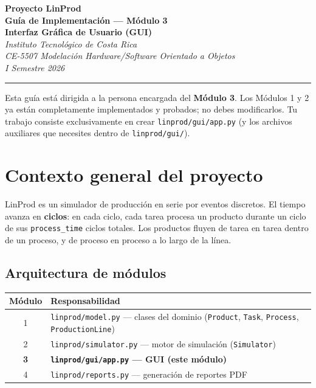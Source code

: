 \documentclass[12pt,letterpaper]{article}
\begin{document}
\begin{center}
    {\Large\bfseries Proyecto LinProd}\\[0.4em]
    {\LARGE\bfseries\color{tecred} Guía de Implementación — Módulo 3}\\[0.5em]
    {\large\bfseries Interfaz Gráfica de Usuario (GUI)}\\[1em]
    \textit{Instituto Tecnológico de Costa Rica}\\
    \textit{CE-5507 Modelación Hardware/Software Orientado a Objetos}\\
    \textit{I Semestre 2026}
\end{center}

\vspace{0.8em}
\hrule
\vspace{1em}

\begin{info}
Esta guía está dirigida a la persona encargada del \textbf{Módulo 3}. Los
Módulos 1 y 2 ya están completamente implementados y probados; no debes
modificarlos. Tu trabajo consiste exclusivamente en crear
\texttt{linprod/gui/app.py} (y los archivos auxiliares que necesites dentro de
\texttt{linprod/gui/}).
\end{info}

\section{Contexto general del proyecto}

LinProd es un simulador de producción en serie por eventos discretos. El
tiempo avanza en \textbf{ciclos}: en cada ciclo, cada tarea procesa un producto
durante un ciclo de sus \texttt{process\_time} ciclos totales. Los productos
fluyen de tarea en tarea dentro de un proceso, y de proceso en proceso a lo
largo de la línea.

\subsection{Arquitectura de módulos}

\begin{center}
\begin{tabular}{cl}
    \toprule
    Módulo & Responsabilidad \\
    \midrule
    1 & \texttt{linprod/model.py} — clases del dominio (\texttt{Product},
        \texttt{Task}, \texttt{Process}, \texttt{ProductionLine}) \\
    2 & \texttt{linprod/simulator.py} — motor de simulación (\texttt{Simulator}) \\
    \textbf{3} & \textbf{\texttt{linprod/gui/app.py} — GUI (este módulo)} \\
    4 & \texttt{linprod/reports.py} — generación de reportes PDF \\
    \bottomrule
\end{tabular}
\end{center}
\end{document}
